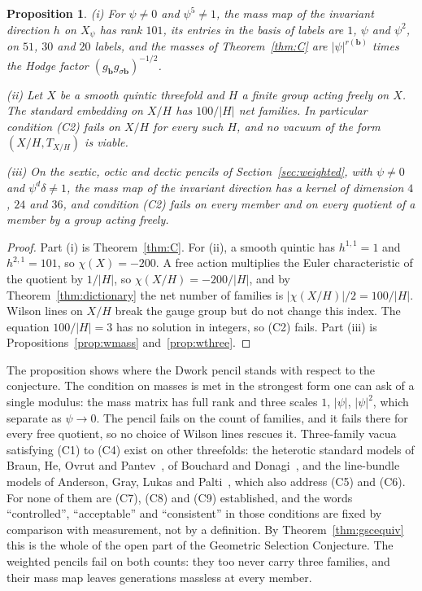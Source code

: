 \documentclass[11pt]{amsart}
\newtheorem{proposition}[theorem]{Proposition}
\theoremstyle{definition}
\theoremstyle{remark}
\newcommand{\bb}{\mathbf{b}}
\begin{document}
\begin{proposition}\label{prop:dworkselect}
\textup{(i)} For $\psi\ne0$ and $\psi^5\ne1$, the mass map of the invariant
direction $h$ on $X_\psi$ has rank $101$, its entries in the basis of
labels are $1$, $\psi$ and $\psi^2$, on $51$, $30$ and $20$ labels, and the
masses of Theorem~\ref{thm:C} are $|\psi|^{r(\bb)}$ times the Hodge factor
$(g_{\bb}g_{\sigma\bb})^{-1/2}$.

\textup{(ii)} Let $X$ be a smooth quintic threefold and $H$ a finite group
acting freely on $X$. The standard embedding on $X/H$ has
$100/|H|$ net families. In particular condition \textup{(C2)} fails on
$X/H$ for every such $H$, and no vacuum of the form $(X/H,T_{X/H})$ is
viable.

\textup{(iii)} On the sextic, octic and dectic pencils of
Section~\ref{sec:weighted}, with $\psi\ne0$ and $\psi^d\delta\ne1$, the
mass map of the invariant direction has a kernel of dimension $4$, $24$ and
$36$, and condition \textup{(C2)} fails on every member and on every
quotient of a member by a group acting freely.
\end{proposition}

\begin{proof}
Part (i) is Theorem~\ref{thm:C}. For (ii), a smooth quintic has
$h^{1,1}=1$ and $h^{2,1}=101$, so $\chi(X)=-200$. A free action multiplies
the Euler characteristic of the quotient by $1/|H|$, so
$\chi(X/H)=-200/|H|$, and by Theorem~\ref{thm:dictionary} the net number of
families is $|\chi(X/H)|/2=100/|H|$. Wilson lines on $X/H$ break the gauge
group but do not change this index. The equation $100/|H|=3$ has no
solution in integers, so (C2) fails. Part (iii) is
Propositions~\ref{prop:wmass} and~\ref{prop:wthree}.
\end{proof}

The proposition shows where the Dwork pencil stands with respect to the
conjecture. The condition on masses is met in the strongest form one can
ask of a single modulus: the mass matrix has full rank and three scales $1$,
$|\psi|$, $|\psi|^2$, which separate as $\psi\to0$. The pencil fails on the
count of families, and it fails there for every free quotient, so no
choice of Wilson lines rescues it. Three-family vacua satisfying (C1) to (C4)
exist on other threefolds: the heterotic standard models of Braun, He,
Ovrut and Pantev~\cite{BHOP05}, of Bouchard and Donagi~\cite{BD06}, and the
line-bundle models of Anderson, Gray, Lukas and Palti~\cite{AGLP11,AGLP12},
which also address (C5) and (C6). For none of them are (C7), (C8) and (C9)
established, and the words ``controlled'', ``acceptable'' and
``consistent'' in those conditions are fixed by comparison with
measurement, not by a definition. By Theorem~\ref{thm:gscequiv} this is the
whole of the open part of the Geometric Selection Conjecture. The weighted
pencils fail on both counts: they too never carry three families, and
their mass map leaves generations massless at every member.
\end{document}
